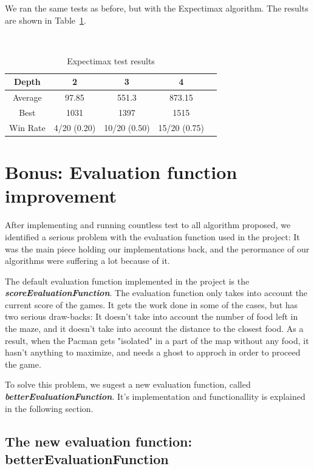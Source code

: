 \documentclass{article}
\begin{document}
We ran the same tests as before, but with the Expectimax algorithm. The results are shown in Table~\ref{tab:expectimax}.

~\\
\begin{table}[!ht]
  \begin{center}
    \begin{tabular}{||c||c|c|c|c||}
      \hline
      Depth & 2 & 3 & 4 \\
      \hline\hline
      Average & 97.85 & 551.3 & 873.15 \\
      \hline\hline
      Best & 1031 & 1397 & 1515 \\
      \hline\hline
      Win Rate & 4/20 (0.20) & 10/20 (0.50) & 15/20 (0.75) \\
      \hline
    \end{tabular}
    \caption{Expectimax test results}
    \label{tab:expectimax}
  \end{center}
\end{table}

\pagebreak
\section{Bonus: Evaluation function improvement}

After implementing and running countless test to all algorithm proposed, we identified a serious problem with the evaluation function used in the project: It was the main piece holding our implementations back, and the perormance of our algorithms were suffering a lot because of it.

The default evaluation function implemented in the project is the \textit{\textbf{scoreEvaluationFunction}}. The evaluation function only takes into account the current score of the games. It gets the work done in some of the cases, but has two serious draw-backs: It doesn't take into account the number of food left in the maze, and it doesn't take into account the distance to the closest food. As a result, when the Pacman gets "isolated" in a part of the map without any food, it hasn't anything to maximize, and needs a ghost to approch in order to proceed the game.

To solve this problem, we sugest a new evaluation function, called \textit{\textbf{betterEvaluationFunction}}. It's implementation and functionallity is explained in the following section.

\subsection{The new evaluation function: betterEvaluationFunction}
\end{document}
